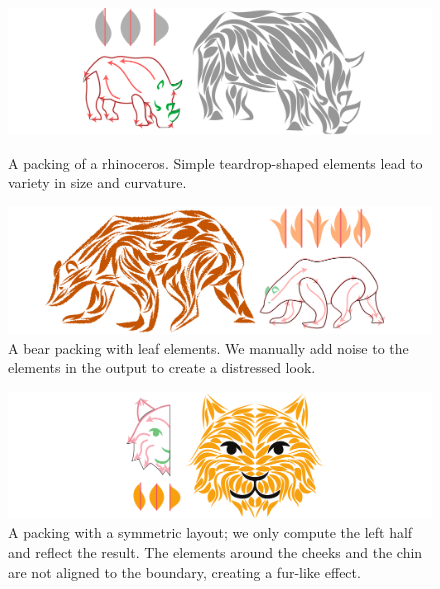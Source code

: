 \begin{figure}[h!]
\centering
\includegraphics[width=1.0\textwidth]{figures/flowpak/result_02.pdf} %
\caption[A packing of a rhinoceros]
{\label{result_rhino}
A packing of a rhinoceros.  Simple teardrop-shaped 
elements lead to variety in size and curvature.}
\bigskip
\includegraphics[width=1.0\textwidth]{figures/flowpak/bear_leaves.pdf} %
\caption[A packing of a bear with leaf elements]
{\label{result_bear_leaves}
  A bear packing with leaf elements.  We manually add noise to the 
  elements in the output to create a distressed look.}
\end{figure}

\begin{figure}[h!]
\centering
\includegraphics[width=1.0\textwidth]{figures/flowpak/cat.pdf}
\caption[A packing of a cat]
{A packing with a symmetric layout; we only compute the left half and reflect the result. The elements around the cheeks and the chin are not aligned to the boundary, creating a fur-like effect.}
\label{result_cat}
\end{figure}

